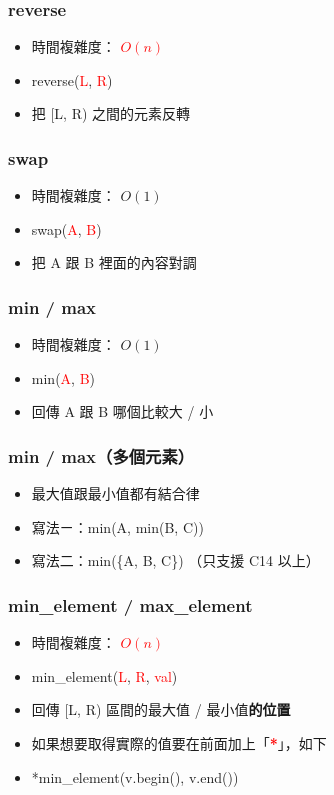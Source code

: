 \documentclass[mathserif]{beamer}
\begin{document}
\begin{frame}
    \frametitle{reverse}
    \begin{itemize}
        \item 時間複雜度： \textcolor{red}{\textbf{$O(n)$}}
        \item reverse(\textcolor{red}{L}, \textcolor{red}{R})
        \item 把 [L, R) 之間的元素反轉
    \end{itemize}
\end{frame}

\begin{frame}
    \frametitle{swap}
    \begin{itemize}
        \item 時間複雜度： $O(1)$
        \item swap(\textcolor{red}{A}, \textcolor{red}{B})
        \item 把 A 跟 B 裡面的內容對調
    \end{itemize}
\end{frame}

\begin{frame}
    \frametitle{min / max}
    \begin{itemize}
        \item 時間複雜度： $O(1)$
        \item min(\textcolor{red}{A}, \textcolor{red}{B})
        \item 回傳 A 跟 B 哪個比較大 / 小
    \end{itemize}
\end{frame}

\begin{frame}
    \frametitle{min / max（多個元素）}
    \begin{itemize}
        \item 最大值跟最小值都有結合律
        \item 寫法ㄧ：min(A, min(B, C))
        \item 寫法二：min(\{A, B, C\}) （只支援 C14 以上）
    \end{itemize}
\end{frame}

\begin{frame}
    \frametitle{min\_element / max\_element}
    \begin{itemize}
        \item 時間複雜度： \textcolor{red}{\textbf{$O(n)$}}
        \item min\_element(\textcolor{red}{L}, \textcolor{red}{R}, \textcolor{red}{val})
        \item 回傳 [L, R) 區間的最大值 / 最小值\textbf{的位置}
        \vspace{0.5cm}
        \item 如果想要取得實際的值要在前面加上「\textcolor{red}{\textbf{*}}」，如下
        \item *min\_element(v.begin(), v.end())
    \end{itemize}
\end{frame}
\end{document}
